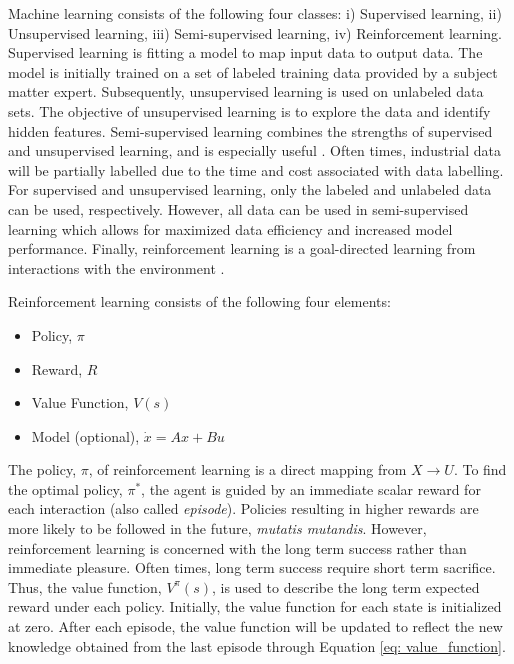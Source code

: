 Machine learning consists of the following four classes: i) Supervised learning, ii) Unsupervised learning, iii) Semi-supervised learning, iv) Reinforcement learning.  Supervised learning is fitting a model to map input data to output data.  The model is initially trained on a set of labeled training data provided by a subject matter expert.  Subsequently, unsupervised learning is used on unlabeled data sets.  The objective of unsupervised learning is to explore the data and identify hidden features. Semi-supervised learning combines the strengths of supervised and unsupervised learning, and is especially useful \cite{machine_learning}.  Often times, industrial data will be partially labelled due to the time and cost associated with data labelling.  For supervised and unsupervised learning, only the labeled and unlabeled data can be used, respectively.  However, all data can be used in semi-supervised learning which allows for maximized data efficiency and increased model performance. Finally, reinforcement learning is a goal-directed learning from interactions with the environment \cite{sutton}.



Reinforcement learning consists of the following four elements:

\begin{itemize}
    \item Policy, $\pi$
    \item Reward, $R$
    \item Value Function, $V(s)$
    \item Model (optional), $\dot{x} = Ax + Bu$
\end{itemize}

The policy, $\pi$, of reinforcement learning is a direct mapping from $X \rightarrow U$.  To find the optimal policy, $\pi^*$, the agent is guided by an immediate scalar reward for each interaction (also called \textit{episode}). Policies resulting in higher rewards are more likely to be followed in the future, \textit{mutatis mutandis}.  However, reinforcement learning is concerned with the long term success rather than immediate pleasure. Often times, long term success require short term sacrifice.  Thus, the value function, $V^{\pi}(s)$, is used to describe the long term expected reward under each policy.  Initially, the value function for each state is initialized at zero.  After each episode, the value function will be updated to reflect the new knowledge obtained from the last episode through Equation \ref{eq: value_function}.

